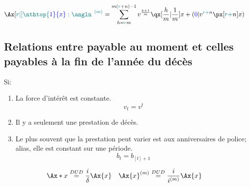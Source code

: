 \documentclass[10pt, french]{article}
\begin{document}
\begin{multicols*}{3}
\begin{align*}
\Ax[\color{teal}r|]{\nthtop{\color{blue}1}{x}:\angln}^{\:\; (m)} &=
	\sum_{h = {\color{teal}r}m}^{m({\color{teal}r} + n) - 1} v^{\frac{k + 1}{m}} \qx[\frac{h}{m} | \frac{1}{m}]{x} + (\textcolor{blue}{0} | v^{{\color{teal}r + }n} \px[{\color{teal}r + }n]{x})
\end{align*}


\subsection{Relations entre payable au moment et celles payables à la fin de l'année du décès}

Si:
\begin{enumerate}
	\item La force d'intérêt est constante.
	\[v_t = v^t\]
	\item Il y a seulement une prestation de décès.
	\item Le plus souvent que la prestation peut varier est aux anniversaires de police; alias, elle est constant sur une période.
	\[b_t = b_{[t] + 1}\]
\end{enumerate}

\begin{align*} 
	\Ax*{x} &\stackrel{DUD}= \frac{i}{\delta} \Ax{x} &
	\Ax{x}^{(m)} &\stackrel{DUD}= \frac{i}{i^{(m)}} \Ax{x} 
\end{align*}




\begin{tikzpicture}[x=0.75pt,y=0.75pt,yscale=-1,xscale=1]


\end{tikzpicture}
\end{multicols*}
\end{document}
